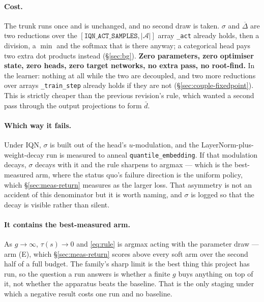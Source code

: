 \documentclass{article}
\newcommand{\actions}{\mathcal{A}}
\newcommand{\gapbar}{\overline{\Delta}}
\newcommand{\dbar}{\bar{d}}
\newcommand{\srank}{\sigma}
\begin{document}
\paragraph{Cost.} The trunk runs once and is unchanged, and no second draw is taken. $\srank$ and
$\gapbar$ are two reductions over the $[\texttt{IQN\_ACT\_SAMPLES}, |\actions|]$ array
\texttt{\_act} already holds, then a division, a $\min$ and the softmax that is there anyway; a
categorical head pays two extra dot products instead (\S\ref{sec:bg}).
\textbf{Zero parameters, zero optimiser state, zero heads, zero target networks, no extra pass,
no root-find.} In the learner: nothing at all while the two are decoupled, and two more
reductions over arrays \texttt{\_train\_step} already holds if they are not
(\S\ref{sec:couple-fixedpoint}). This is strictly cheaper
than the previous revision's rule, which wanted a second pass through the output projections to
form $\dbar$.

\paragraph{Which way it fails.} Under IQN, $\srank$ is built out of the head's
$u$-modulation, and the LayerNorm-plus-weight-decay run is measured to anneal
\texttt{quantile\_embedding}. If that modulation decays, $\srank$ decays with it and the rule
sharpens to argmax --- which is the best-measured arm, where the status quo's failure direction
is the uniform policy, which \S\ref{sec:meas-return} measures as the larger loss. That asymmetry
is not an accident of
this denominator but it is worth naming, and $\srank$ is logged so that the decay is visible
rather than silent.

\paragraph{It contains the best-measured arm.} As $g \to \infty$, $\tau(s) \to 0$ and
\eqref{eq:rule} is argmax acting with the parameter draw --- arm (E), which
\S\ref{sec:meas-return} scores above every soft arm over the second half of a full budget. The
family's sharp limit is the best thing this project has run, so the question a run answers is
whether a finite $g$ buys anything on top of it, not whether the apparatus beats the baseline.
That is the only staging under which a negative result costs one run and no baseline.
\end{document}
